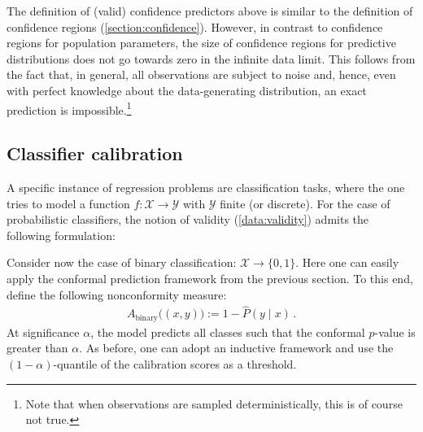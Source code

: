     \begin{remark}
        The definition of (valid) confidence predictors above is similar to the definition of confidence regions (\cref{section:confidence}). However, in contrast to confidence regions for population parameters, the size of confidence regions for predictive distributions does not go towards zero in the infinite data limit. This follows from the fact that, in general, all observations are subject to noise and, hence, even with perfect knowledge about the data-generating distribution, an exact prediction is impossible.\footnote{Note that when observations are sampled deterministically, this is of course not true.}
    \end{remark}

\subsection{Classifier calibration}

    A specific instance of regression problems are classification tasks, where the one tries to model a function $f:\mathcal{X}\rightarrow\mathcal{Y}$ with $\mathcal{Y}$ finite (or discrete). For the case of probabilistic classifiers, the notion of validity (\cref{data:validity}) admits the following formulation:

    Consider now the case of binary classification: $\mathcal{X}\rightarrow\{0,1\}$. Here one can easily apply the conformal prediction framework from the previous section. To this end, define the following nonconformity measure:
    \begin{gather}
        A_{\text{binary}}\bigl((x,y)\bigr) := 1 - \widehat{P}(y\mid x)\,.
    \end{gather}
    At significance $\alpha$, the model predicts all classes such that the conformal $p$-value is greater than $\alpha$. As before, one can adopt an inductive framework and use the $(1-\alpha)$-quantile of the calibration scores as a threshold.

